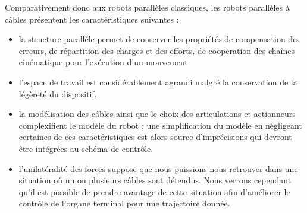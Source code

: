 Comparativement donc aux robots parallèles classiques, les robots parallèles à câbles présentent les caractéristiques suivantes :
\begin{itemize}
 \item la structure parallèle permet de conserver les propriétés de compensation des erreurs, de répartition des charges et des efforts, de coopération des chaînes cinématique pour l'exécution d'un mouvement
 \item l'espace de travail est considérablement agrandi malgré la conservation de la légèreté du dispositif.
 \item la modélisation des câbles ainsi que le choix des articulations et actionneurs complexifient le modèle du robot ; une simplification du modèle en négligeant certaines de ces caractéristiques est alors source d'imprécisions qui devront être intégrées au schéma de contrôle.
 \item l'unilatéralité des forces suppose que nous puissions nous retrouver dans une situation où un ou plusieurs câbles sont détendus. Nous verrons cependant qu'il est possible de prendre avantage de cette situation afin d'améliorer le contrôle de l'organe terminal pour une trajectoire donnée.
\end{itemize}



